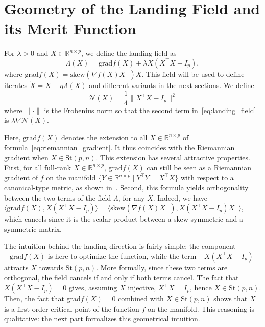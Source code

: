 \documentclass[twoside,11pt]{article}
\newcommand{\grad}{{\mathrm{grad}}}
\newcommand{\stiefel}{{\mathrm{St}(p, n)}}
\newcommand{\sk}{{\mathrm{skew}}}
\begin{document}
%
%
%
%
%
%
%
%
%
%
%

%

%

%
%
%
%
%
%
%
%
%
%
%
%
%
%

\section{Geometry of the Landing Field and its Merit Function}
%
\label{sec:landing}
For $\lambda > 0$ and $X\in\mathbb{R}^{n\times p}$, we define the landing field as 
\begin{equation}
  \label{eq:landing_field}
  \Lambda(X) =\grad f(X) + \lambda X(X^\top X - I_p),
\end{equation}
where $\grad f(X) = \sk(\nabla f(X)X^\top)X$.
This field will be used to define iterates $\tilde{X} = X - \eta \Lambda(X)$ and different variants in the next sections.
We define 
\begin{equation}
\label{eq:norm_function}
    \mathcal{N}(X) = \frac14\|X^\top X - I_p\|^2
\end{equation}
where $\|\cdot\|$ is the Frobenius norm so that the second term in~\eqref{eq:landing_field} 
%
is $\lambda \nabla \mathcal{N}(X)$. 

Here, $\grad f(X)$ denotes the extension to all $X\in\mathbb{R}^{n\times p}$ of formula~\eqref{eq:riemannian_gradient}. It thus coincides with the Riemannian gradient when $X\in\stiefel$. This extension has several attractive properties.
First, for all full-rank $X\in\mathbb{R}^{n\times p}$, $\grad f(X)$ can still be seen as a Riemannian gradient of $f$ on the manifold $\{Y\in\mathbb{R}^{n\times p} \mid Y^\top Y = X^\top X\}$ with respect to a canonical-type metric, as shown in~\cite[Proposition~4]{gao2022optimization}.
Second, this formula yields orthogonality between the two terms of the field $\Lambda$, for any $X$. Indeed, we have $\langle\grad f(X), X(X^\top X - I_p)\rangle = \langle\sk(\nabla f(X)X^\top),X(X^\top X - I_p)X^\top\rangle$, which cancels since it is the scalar product between a skew-symmetric and a symmetric matrix.

The intuition behind the landing direction is fairly simple: the component $-\grad f(X)$ is here to optimize the function, while the term $-X(X^\top X - I_p)$ attracts $X$
towards $\stiefel$.
More formally, since these two terms are orthogonal, the field cancels if and only if both terms cancel. The fact that $X(X^\top X - I_p)=0$ gives, assuming $X$ injective,  $X^\top X = I_p$, hence $X\in \stiefel$. Then, the fact that $\grad f(X) =0$ combined with $X\in\stiefel$ shows that $X$ is a first-order critical point of the function $f$ on the manifold.
This reasoning is qualitative: the next part formalizes this geometrical intuition.
\end{document}
